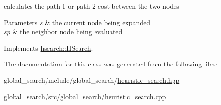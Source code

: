 calculates the path 1 or path 2 cost between the two nodes 


\begin{DoxyParams}{Parameters}
{\em s} & the current node being expanded \\
\hline
{\em sp} & the neighbor node being evaluated \\
\hline
\end{DoxyParams}


Implements \hyperlink{classhsearch_1_1HSearch_a5d325955c4faedaca0c68155fd1f7e69}{hsearch\+::\+H\+Search}.



The documentation for this class was generated from the following files\+:\begin{DoxyCompactItemize}
\item 
global\+\_\+search/include/global\+\_\+search/\hyperlink{heuristic__search_8hpp}{heuristic\+\_\+search.\+hpp}\item 
global\+\_\+search/src/global\+\_\+search/\hyperlink{heuristic__search_8cpp}{heuristic\+\_\+search.\+cpp}\end{DoxyCompactItemize}
